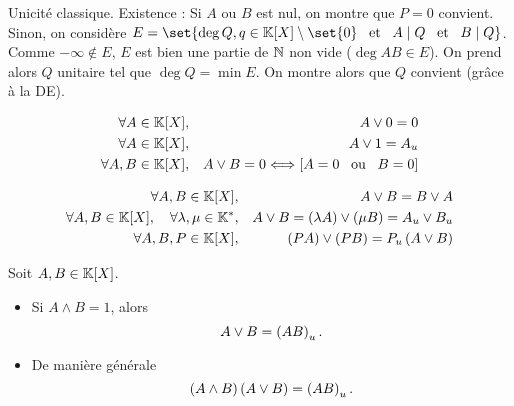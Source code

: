 \documentclass{magnolia}
\begin{document}
\begin{preuve}
Unicité classique.
Existence : Si $A$ ou $B$ est nul, on montre que $P=0$ convient. Sinon, on considère $E=\set{\deg Q, q\in \polyK\setminus\set{0} \et A\mid Q \et B\mid Q}$. Comme $-\infty\notin E$, $E$ est bien une partie de $\mathbb{N}$ non vide ($\deg AB \in E$). On prend alors $Q$ unitaire tel que $\deg Q=\min E$. On montre alors que $Q$ convient (grâce à la DE).
\end{preuve}

\begin{proposition}
\begin{eqnarray*}
\forall A\in\polyK, & & A\vee 0=0\\
\forall A\in\polyK,& & A\vee 1=A_u\\
\forall A,B\in\polyK, & & A\vee B=0 \ssi \cro{A=0 \ou B=0}
\end{eqnarray*}
\end{proposition}

\begin{proposition}
\begin{eqnarray*}
\forall A,B\in\polyK, & & A\vee B=B\vee A\\
\forall A,B\in\polyK \qsep \forall \lambda,\mu\in\Ks, & &
  A\vee B=\p{\lambda A}\vee\p{\mu B}=A_u\vee B_u\\
\forall A,B,P\in\polyK, & & \p{PA}\vee\p{PB}=P_u\p{A\vee B}
\end{eqnarray*}
\end{proposition}


\begin{proposition}
Soit $A,B\in\polyK$.
\begin{itemize}
\item Si $A\wedge B=1$, alors
  \[A\vee B=\left(AB\right)_u.\]
\item De manière générale
  \[\left(A\wedge B\right)\left(A\vee B\right)=\left(AB\right)_u.\]
\end{itemize}
\end{proposition}
\end{document}

